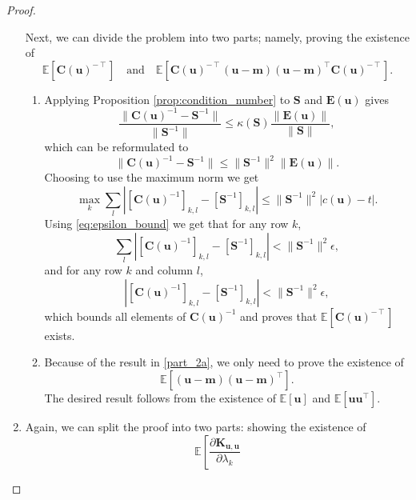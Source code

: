 \documentclass{article}
\theoremstyle{definition}
\newcommand{\Kuu}{\mathbf{K}_{\mathbf{u},\mathbf{u}}}
\begin{document}
\begin{proof}
\begin{enumerate}
    Next, we can divide the problem into two parts; namely, proving the
    existence of
    \[
      \mathbb{E}[\mathbf{C}(\mathbf{u})^{-\intercal}] \quad \text{and} \quad
      \mathbb{E}[\mathbf{C}(\mathbf{u})^{-\intercal}(\mathbf{u} -
      \mathbf{m})(\mathbf{u} -
      \mathbf{m})^\intercal\mathbf{C}(\mathbf{u})^{-\intercal}].
    \]
    \begin{enumerate}
    \item \label{part_2a} Applying Proposition \ref{prop:condition_number} to
      $\mathbf{S}$ and $\mathbf{E}(\mathbf{u})$ gives
      \[
        \frac{\lVert \mathbf{C}(\mathbf{u})^{-1} - \mathbf{S}^{-1}
          \rVert}{\lVert \mathbf{S}^{-1} \rVert} \le
        \kappa(\mathbf{S})\frac{\lVert \mathbf{E}(\mathbf{u}) \rVert}{\lVert
          \mathbf{S} \rVert},
      \] %
      which can be reformulated to
      \[
        \lVert \mathbf{C}(\mathbf{u})^{-1} - \mathbf{S}^{-1} \rVert \le \lVert
        \mathbf{S}^{-1} \rVert^2 \lVert \mathbf{E}(\mathbf{u}) \rVert.
      \]
      Choosing to use the maximum norm we get %
      \[
        \max_k \sum_l |[\mathbf{C}(\mathbf{u})^{-1}]_{k,l} -
        [\mathbf{S}^{-1}]_{k,l}| \le \lVert \mathbf{S}^{-1} \rVert^2
        |c(\mathbf{u}) - t|.
      \]
      Using \eqref{eq:epsilon_bound} we get that for any row $k$,
      \[
        \sum_l \left| [\mathbf{C}(\mathbf{u})^{-1}]_{k,l} -
          [\mathbf{S}^{-1}]_{k,l} \right| <
        \lVert \mathbf{S}^{-1} \rVert^2\epsilon,
      \]
      and for any row $k$ and column $l$,
      \[
        \left| [\mathbf{C}(\mathbf{u})^{-1}]_{k,l} - [\mathbf{S}^{-1}]_{k,l}
        \right| < \lVert \mathbf{S}^{-1} \rVert^2\epsilon,
      \]
      which bounds all elements of $\mathbf{C}(\mathbf{u})^{-1}$ and proves that
      $\mathbb{E}[\mathbf{C}(\mathbf{u})^{-\intercal}]$ exists.
    \item Because of the result in \ref{part_2a}, we only need to prove the
      existence of
      \[
        \mathbb{E}[(\mathbf{u} - \mathbf{m})(\mathbf{u} -
        \mathbf{m})^\intercal].
      \]
      The desired result follows from the existence of $\mathbb{E}[\mathbf{u}]$
      and $\mathbb{E}[\mathbf{u}\mathbf{u}^\intercal]$.
    \end{enumerate}
  \item Again, we can split the proof into two parts: showing the existence of
    \[
      \mathbb{E} \left[ \left. \frac{\partial \Kuu}{\partial \lambda_k}
\]
\end{enumerate}
\end{proof}
\end{document}
